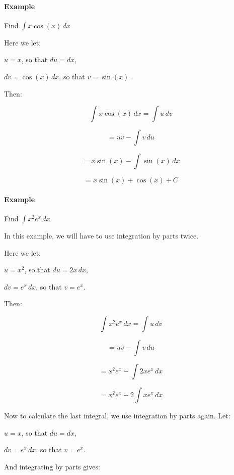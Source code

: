 \paragraph{Example}



Find $\int x \cos(x) \, dx$



Here we let:  

$u = x$, so that $du = dx$,  

$dv = \cos(x) \, dx$, so that $v = \sin(x)$.



Then:



$$\int x \cos(x) \, dx = \int u \, dv$$  

$$= uv - \int v \, du$$  

$$= x \sin(x) - \int \sin(x) \, dx$$  

$$= x \sin(x) + \cos(x) + C$$



\paragraph{Example}



Find $\int x^2 e^x \, dx$



In this example, we will have to use integration by parts twice.



Here we let:  

$u = x^2$, so that $du = 2x \, dx$,  

$dv = e^x \, dx$, so that $v = e^x$.



Then:



$$\int x^2 e^x \, dx = \int u \, dv$$  

$$= uv - \int v \, du$$  

$$= x^2 e^x - \int 2x e^x \, dx$$  

$$= x^2 e^x - 2 \int x e^x \, dx$$



Now to calculate the last integral, we use integration by parts again. Let:  

$u = x$, so that $du = dx$,  

$dv = e^x \, dx$, so that $v = e^x$.



And integrating by parts gives:



